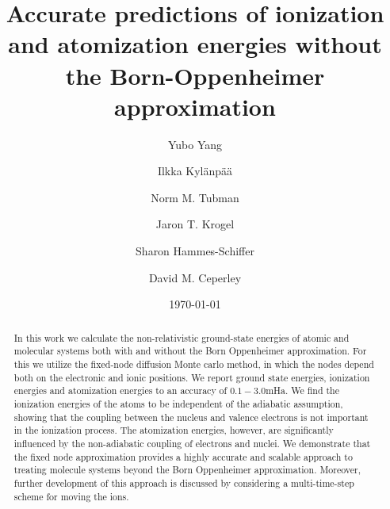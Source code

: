\documentclass[pra,superscriptaddress,groupedaddress,twocolumn]{revtex4}
\begin{document}
\title{Accurate predictions of ionization and atomization energies without the Born-Oppenheimer approximation}
\author{Yubo Yang}
\author{Ilkka Kyl\"{a}np\"{a}\"{a}}
\author{Norm M. Tubman}
\author{Jaron T. Krogel}
\author{Sharon Hammes-Schiffer}
\author{David M. Ceperley}
\date{\today}


\begin{abstract}
In this work we calculate the non-relativistic ground-state energies of atomic and molecular systems both with and without the Born Oppenheimer approximation. For this we utilize the fixed-node diffusion Monte carlo method, in which the nodes depend both on the electronic and ionic positions. We report ground state energies, ionization energies and atomization energies to an accuracy of $0.1-3.0$mHa. We find the ionization energies of the atoms to be independent of the adiabatic assumption, showing that the coupling between the nucleus and valence electrons is not important in the ionization process. The atomization energies, however, are significantly influenced by the non-adiabatic coupling of electrons and nuclei. We demonstrate that the fixed node approximation provides a highly accurate and scalable approach to treating molecule systems beyond the Born Oppenheimer approximation. Moreover, further development of this approach is discussed by considering a multi-time-step scheme for moving the ions. 
\end{abstract}

\maketitle
\end{document}
